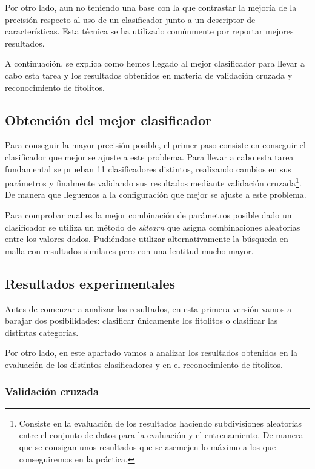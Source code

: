 Por otro lado, aun no teniendo una base con la que contrastar la mejoría de la precisión respecto al uso de un clasificador junto a un descriptor de características. Esta técnica se ha utilizado comúnmente por reportar mejores resultados. 

A continuación, se explica como hemos llegado al mejor clasificador para llevar a cabo esta tarea y los resultados obtenidos en materia de validación cruzada y reconocimiento de fitolitos.

\subsection{Obtención del mejor clasificador}

Para conseguir la mayor precisión posible, el primer paso consiste en conseguir el clasificador que mejor se ajuste a este problema. Para llevar a cabo esta tarea fundamental se prueban 11 clasificadores distintos, realizando cambios en sus parámetros y finalmente validando sus resultados mediante validación cruzada\footnote{Consiste en la evaluación de los resultados haciendo subdivisiones aleatorias entre el conjunto de datos para la evaluación y el entrenamiento. De manera que se consigan unos resultados que se asemejen lo máximo a los que conseguiremos en la práctica.}. De manera que lleguemos a la configuración que mejor se ajuste a este problema.

Para comprobar cual es la mejor combinación de parámetros posible dado un clasificador se utiliza un método de \textit{sklearn} que asigna combinaciones aleatorias entre los valores dados. Pudiéndose utilizar alternativamente la búsqueda en malla con resultados similares pero con una lentitud mucho mayor.

\subsection{Resultados experimentales}

Antes de comenzar a analizar los resultados, en esta primera versión vamos a barajar dos posibilidades: clasificar únicamente los fitolitos o clasificar las distintas categorías. 

Por otro lado, en este apartado vamos a analizar los resultados obtenidos en la evaluación de los distintos clasificadores y en el reconocimiento de fitolitos.

\subsubsection{Validación cruzada}


